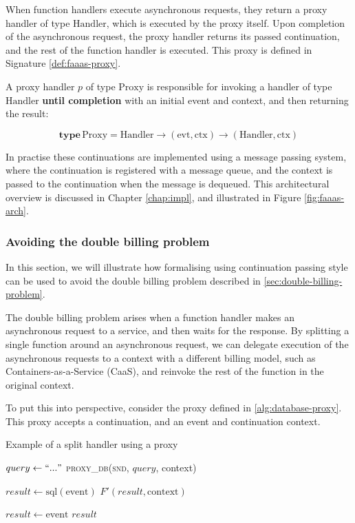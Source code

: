 When function handlers execute asynchronous requests, they return a proxy handler of type $\textrm{Handler}$, which is executed by the proxy itself. Upon completion of the asynchronous request, the proxy handler returns its passed continuation, and the rest of the function handler is executed. This proxy is defined in Signature \ref{def:faaas-proxy}.

\begin{signature}
\label{def:faaas-proxy}
A proxy handler $p$ of type $\textrm{Proxy}$ is responsible for invoking a \faas{} handler of type $\textrm{Handler}$ \textbf{until completion} with an initial event and context, and then returning the result:

$$\textbf{type}\, \textrm{Proxy} = \textrm{Handler} \rightarrow (\textrm{evt}, \textrm{ctx}) \rightarrow (\textrm{Handler}, \textrm{ctx})$$
\end{signature}

In practise these continuations are implemented using a message passing system, where the continuation is registered with a message queue, and the context is passed to the continuation when the message is dequeued. This architectural overview is discussed in Chapter \ref{chap:impl}, and illustrated in Figure \ref{fig:faaas-arch}.

\subsubsection{Avoiding the double billing problem}
In this section, we will illustrate how formalising \faas{} using continuation passing style can be used to avoid the double billing problem described in \ref{sec:double-billing-problem}.

The double billing problem arises when a function handler makes an asynchronous request to a service, and then waits for the response. By splitting a single function around an asynchronous request, we can delegate execution of the asynchronous requests to a context with a different billing model, such as Containers-as-a-Service (CaaS), and reinvoke the rest of the function in the original \faas{} context.

To put this into perspective, consider the proxy defined in \ref{alg:database-proxy}. This proxy accepts a continuation, and an event and continuation context.

\begin{algorithm}
\caption{Example of a split handler using a proxy}
\label{alg:database-proxy}
\begin{algorithmic}[1]
    \State $query \gets ``..."$
    \State \Return \textsc{proxy_db}(\textsc{snd}, $query$, context)
\EndFunction

    \State $result \gets \textrm{sql}(\textrm{event})$
    \State \Return $F'(result, \textrm{context})$
\EndFunction

    \State $result \gets \textrm{event}$
    \State \Return $result$
\EndFunction
\end{algorithmic}
\end{algorithm}

